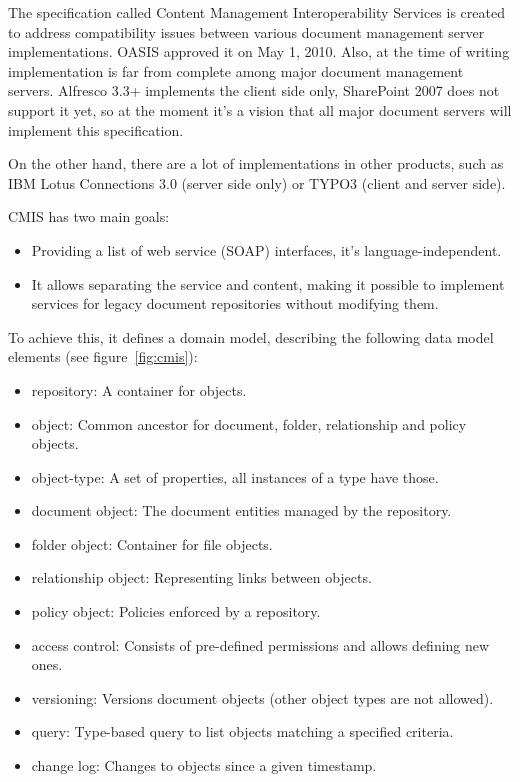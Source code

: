 The specification called Content Management Interoperability
Services\cite{cmis} is created to address compatibility issues between various
document management server implementations. OASIS approved it on May 1, 2010.
Also, at the time of writing implementation is far from complete among major
document management servers. Alfresco 3.3+ implements the client side only,
SharePoint 2007 does not support it yet, so at the moment it's a vision that
all major document servers will implement this specification.

On the other hand, there are a lot of implementations in other products, such
as IBM Lotus Connections 3.0\cite{lotus} (server side only) or TYPO3 (client
and server side).

CMIS has two main goals:

\begin{itemize}
\item Providing a list of web service (SOAP) interfaces, it's language-independent.
\item It allows separating the service and content, making it possible to
implement services for legacy document repositories without modifying them.
\end{itemize}

To achieve this, it defines a domain model, describing the following data model
elements (see figure~\ref{fig:cmis}):

\begin{itemize}
\item repository: A container for objects.
\item object: Common ancestor for document, folder, relationship and policy objects.
\item object-type: A set of properties, all instances of a type have those.
\item document object: The document entities managed by the repository.
\item folder object: Container for file objects.
\item relationship object: Representing links between objects.
\item policy object: Policies enforced by a repository.
\item access control: Consists of pre-defined permissions and allows defining new ones.
\item versioning: Versions document objects (other object types are not allowed).
\item query: Type-based query to list objects matching a specified criteria.
\item change log: Changes to objects since a given timestamp.
\end{itemize}

